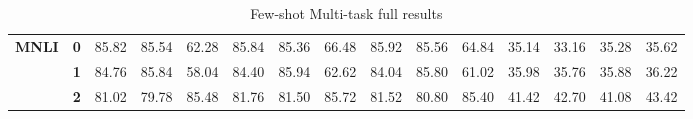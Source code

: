 \begin{sidewaystable*}[h]
\begin{tabular*}{\columnwidth}{l@{\extracolsep{\fill}}lccccccccccccc}
		\hline
		\multirow{3}{*}{\textbf{MNLI}}      & \textbf{0} & 85.82                          & 85.54                          & 62.28                          & 85.84                          & 85.36                          & 66.48                          & 85.92                          & 85.56                          & 64.84                          & 35.14                          & 33.16                          & 35.28                          & 35.62                              \\
		& \textbf{1} & 84.76                          & 85.84                          & 58.04                          & 84.40                          & 85.94                          & 62.62                          & 84.04                          & 85.80                          & 61.02                          & 35.98                          & 35.76                          & 35.88                          & 36.22                              \\
		& \textbf{2} & 81.02                          & 79.78                          & 85.48                          & 81.76                          & 81.50                          & 85.72                          & 81.52                          & 80.80                          & 85.40                          & 41.42                          & 42.70                          & 41.08                          & 43.42                             \\
		\bottomrule
\end{tabular*}
	\caption{Few-shot Multi-task full results}\label{tab:multi-use-logits-full}
\end{sidewaystable*}
